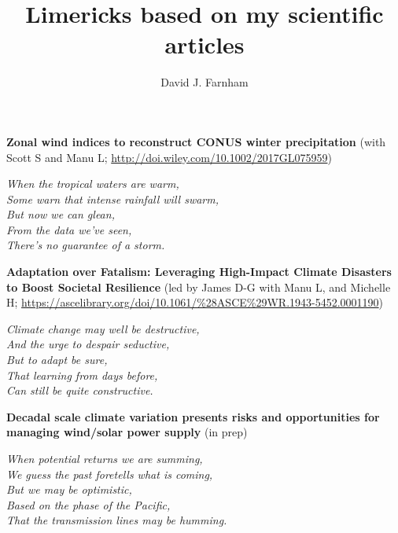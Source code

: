 \documentclass{article}
\title{
Limericks based on my scientific articles
}
\author{David J. Farnham}
\begin{document}
\maketitle




\noindent
\textbf{Zonal wind indices to reconstruct CONUS winter precipitation} (with Scott S and Manu L; \url{http://doi.wiley.com/10.1002/2017GL075959})\\

\vspace{0.25cm}

{\large
\noindent
\textit{When the tropical waters are warm,\\
Some warn that intense rainfall will swarm,\\
\null \hspace{0.5cm} But now we can glean,\\
\null \hspace{0.5cm} From the data we've seen,\\
There's no guarantee of a storm.}
}

\vspace{0.75cm}


\noindent
\textbf{Adaptation over Fatalism: Leveraging High-Impact Climate Disasters to Boost Societal Resilience} (led by James D-G with Manu L, and Michelle H; \url{https://ascelibrary.org/doi/10.1061/%28ASCE%29WR.1943-5452.0001190})\\

\vspace{0.25cm}

{\large
\noindent
\textit{Climate change may well be destructive,\\
And the urge to despair seductive,\\
\null \hspace{0.5cm} But to adapt be sure,\\
\null \hspace{0.5cm} That learning from days before,\\
Can still be quite constructive.}
}

\vspace{0.75cm}

\noindent
\textbf{Decadal scale climate variation presents risks and opportunities for managing wind/solar power supply} (in prep)\\

\vspace{0.25cm}

{\large
\noindent
\textit{When potential returns we are summing,\\
We guess the past foretells what is coming,\\
\null \hspace{0.5cm} But we may be optimistic,\\
\null \hspace{0.5cm} Based on the phase of the Pacific,\\
That the transmission lines may be humming.}
}
\end{document}
